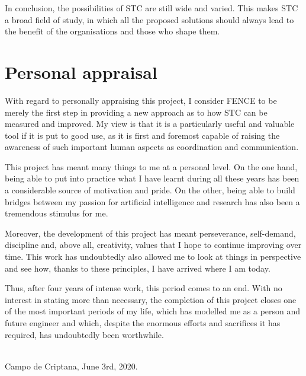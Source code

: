 In conclusion, the possibilities of STC are still wide and varied. This makes STC a broad field of study, in which all the proposed solutions should always lead to the benefit of the organisations and those who shape them.

\section{Personal appraisal}

With regard to personally appraising this project, I consider FENCE to be merely the first step in providing a new approach as to how STC can be measured and improved. My view is that it is a particularly useful and valuable tool if it is put to good use, as it is first and foremost capable of raising the awareness of such important human aspects as coordination and communication.

This project has meant many things to me at a personal level. On the one hand, being able to put into practice what I have learnt during all these years has been a considerable source of motivation and pride. On the other, being able to build bridges between my passion for artificial intelligence and research has also been a tremendous stimulus for me.

Moreover, the development of this project has meant perseverance, self-demand, discipline and, above all, creativity, values that I hope to continue improving over time. This work has undoubtedly also allowed me to look at things in perspective and see how, thanks to these principles, I have arrived where I am today.

Thus, after four years of intense work, this period comes to an end. With no interest in stating more than necessary, the completion of this project closes one of the most important periods of my life, which has modelled me as a person and future engineer and which, despite the enormous efforts and sacrifices it has required, has undoubtedly been worthwhile.

\makeatletter		
\begin{flushright}
	\vspace{1,5cm}
	\textit{\@autor}\\
	Campo de Criptana, June 3rd, 2020.
\end{flushright}
\makeatother